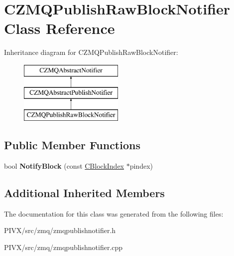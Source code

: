 \hypertarget{class_c_z_m_q_publish_raw_block_notifier}{}\section{C\+Z\+M\+Q\+Publish\+Raw\+Block\+Notifier Class Reference}
\label{class_c_z_m_q_publish_raw_block_notifier}
Inheritance diagram for C\+Z\+M\+Q\+Publish\+Raw\+Block\+Notifier\+:\begin{figure}[H]
\begin{center}
\leavevmode
\includegraphics[height=3.000000cm]{class_c_z_m_q_publish_raw_block_notifier}
\end{center}
\end{figure}
\subsection*{Public Member Functions}
\begin{DoxyCompactItemize}
\item 
\mbox{\label{class_c_z_m_q_publish_raw_block_notifier_a738539ca93e4ae80f283cd3ad8e949d9}} 
bool {\bfseries Notify\+Block} (const \mbox{\hyperlink{class_c_block_index}{C\+Block\+Index}} $\ast$pindex)
\end{DoxyCompactItemize}
\subsection*{Additional Inherited Members}


The documentation for this class was generated from the following files\+:\begin{DoxyCompactItemize}
\item 
P\+I\+V\+X/src/zmq/zmqpublishnotifier.\+h\item 
P\+I\+V\+X/src/zmq/zmqpublishnotifier.\+cpp\end{DoxyCompactItemize}
